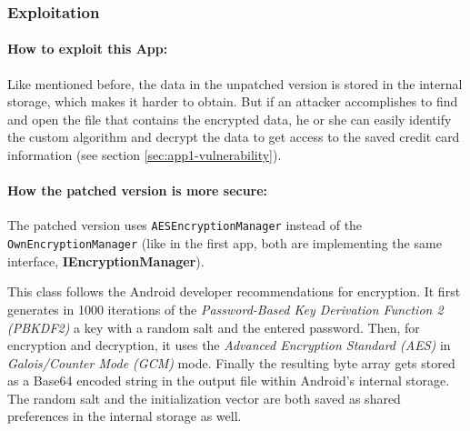\subsubsection{Exploitation}
\paragraph{How to exploit this App:}
Like mentioned before, the data in the unpatched version is stored in the internal storage, which makes it harder to obtain. But if an attacker accomplishes to find and open the file that contains the encrypted data, he or she can easily identify the custom algorithm and decrypt the data to get access to the saved credit card information (see section \ref{sec:app1-vulnerability}).


\paragraph{How the patched version is more secure:}
The patched version uses \texttt{AESEncryptionManager} instead of the \texttt{OwnEncryptionManager} (like in the first app, both are implementing the same interface, \textbf{IEncryptionManager}).

This class follows the Android developer recommendations for encryption. It first generates in 1000 iterations of the \textit{Password-Based Key Derivation Function 2 (PBKDF2)} a key with a random salt and the entered password. Then, for encryption and decryption, it uses the \textit{Advanced Encryption Standard (AES)} in \textit{Galois/Counter Mode (GCM)} mode. Finally the resulting byte array gets stored as a Base64 encoded string in the output file within Android's internal storage. The random salt and the initialization vector are both saved as shared preferences in the internal storage as well.
